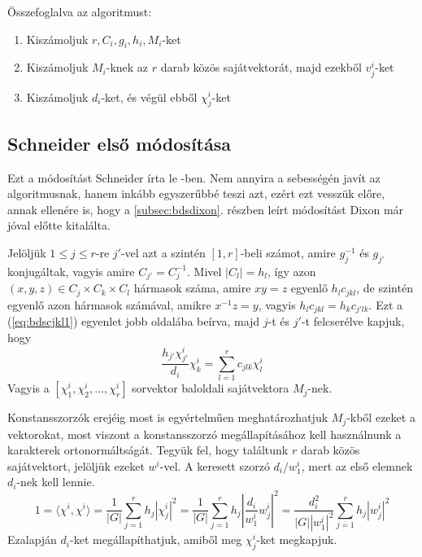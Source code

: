 \noindent
Összefoglalva az algoritmust:
\begin{enumerate}
\item Kiszámoljuk $r, C_i, g_i, h_i, M_i$-ket
\item Kiszámoljuk $M_i$-knek az $r$ darab közös sajátvektorát, majd ezekből $v^i_j$-ket
\item Kiszámoljuk $d_i$-ket, és végül ebből $\chi^i_j$-ket
\end{enumerate}

\subsection{Schneider első módosítása}
\label{subsec:bdssch1}
Ezt a módosítást Schneider írta le \cite{Sch90}-ben.
Nem annyira a sebességén javít az algoritmusnak, hanem inkább egyszerűbbé teszi azt, ezért ezt vesszük előre,
annak ellenére is, hogy a \ref{subsec:bdsdixon}. részben leírt módosítást Dixon már jóval előtte kitalálta.

Jelöljük $1\le j \le r$-re $j'$-vel azt a szintén $[1, r]$-beli számot, amire $g_j^{-1}$ és $g_{j'}$ konjugáltak,
vagyis amire $C_{j'}=C_j^{-1}$. Mivel $|C_l|=h_l$, így azon $(x, y, z)\in C_j \times C_k \times C_l$ hármasok száma,
amire $xy=z$ egyenlő $h_l c_{jkl}$, de szintén egyenlő azon hármasok számával, amikre $x^{-1}z=y$, vagyis $h_l c_{jkl}=h_k c_{j'lk}$.
Ezt a (\ref{eq:bdscjkl1}) egyenlet jobb oldalába beírva, majd $j$-t és $j'$-t felcserélve kapjuk, hogy
\begin{equation}
\label{eq:bdssch1}
\frac{h_{j'}\chi^i_{j'}}{d_i}\chi^i_k=\sum_{l=1}^r c_{jlk}\chi^i_l
\end{equation}
Vagyis a $[\chi^i_1, \chi^i_2, \dots, \chi^i_r]$ sorvektor baloldali sajátvektora $M_j$-nek.

Konstansszorzók erejéig most is egyértelműen meghatározhatjuk $M_j$-kből ezeket a vektorokat, most viszont a konstansszorzó megállapításához
kell használnunk a karakterek ortonormáltságát. Tegyük fel, hogy találtunk $r$ darab közös sajátvektort, jelöljük ezeket $w^i$-vel.
A keresett szorzó $d_i/w^i_1$, mert az első elemnek $d_i$-nek kell lennie.
\begin{equation}
\label{eq:bdssch2}
1 = \langle \chi^i, \chi^i \rangle = \frac{1}{|G|}\sum_{j=1}^r h_j |\chi^i_j|^2 = \frac{1}{|G|}\sum_{j=1}^r h_j \left|\frac{d_i}{w^i_1} w^i_j\right|^2 = 
\frac{d_i^2}{|G| |w^i_1|^2} \sum_{j=1}^r h_j |w^i_j|^2
\end{equation}
Ezalapján $d_i$-ket megállapíthatjuk, amiből meg $\chi^i_j$-ket megkapjuk.


